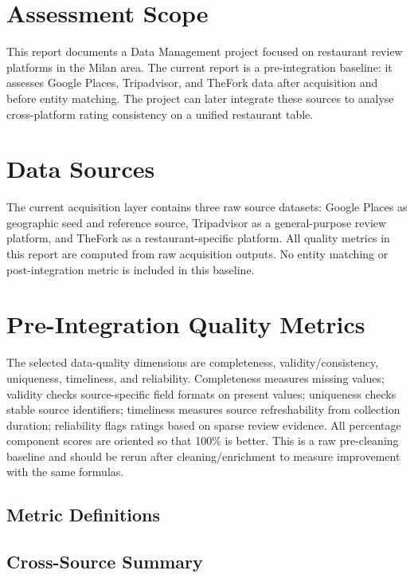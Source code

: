 \section{Assessment Scope}

This report documents a Data Management project focused on restaurant review
platforms in the Milan area. The current report is a pre-integration baseline:
it assesses Google Places, Tripadvisor, and TheFork data after acquisition and
before entity matching. The project can later integrate these sources to analyse
cross-platform rating consistency on a unified restaurant table.

\section{Data Sources}

The current acquisition layer contains three raw source datasets:
Google Places as geographic seed and reference source, Tripadvisor as a
general-purpose review platform, and TheFork as a restaurant-specific platform.
All quality metrics in this report are computed from raw acquisition outputs.
No entity matching or post-integration metric is included in this baseline.

\section{Pre-Integration Quality Metrics}

The selected data-quality dimensions are completeness, validity/consistency,
uniqueness, timeliness, and reliability. Completeness measures missing values;
validity checks source-specific field formats on present values; uniqueness
checks stable source identifiers; timeliness measures source refreshability from
collection duration; reliability flags ratings based on sparse review evidence.
All percentage component scores are oriented so that 100\% is better. This is a
raw pre-cleaning baseline and should be rerun after cleaning/enrichment to
measure improvement with the same formulas.

\subsection{Metric Definitions}


\subsection{Cross-Source Summary}

